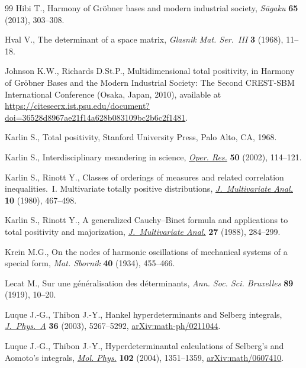 \documentclass[10pt,a4paper]{amsart}
\numberwithin{equation}{section}
\begin{document}
\begin{thebibliography}{99}
Hibi T., Harmony of {G}r\"obner bases and modern industrial society,
 \textit{S\={u}gaku} \textbf{65} (2013), 303--308.

Hval V., The determinant of a space matrix, \textit{Glasnik Mat. Ser.~{III}}
 \textbf{3} (1968), 11--18.

Johnson K.W., Richards D.St.P., Multidimensional total positivity, in Harmony of
 {G}r\"obner {B}ases and the {M}odern {I}ndustrial {S}ociety: {T}he {S}econd
 {CREST}-{SBM} {I}nternational {C}onference (Osaka, Japan, 2010), available at
 \url{https://citeseerx.ist.psu.edu/document?doi=36528d8967ae21f14a628b083109bc2b6c2f1481}.

Karlin S., Total positivity, Stanford University Press, Palo Alto, CA, 1968.

Karlin S., Interdisciplinary meandering in science, \href{https://doi.org/10.1287/opre.50.1.114.17800}{\textit{Oper. Res.}} \textbf{50} (2002), 114--121.

Karlin S., Rinott Y., Classes of orderings of measures and related correlation
 inequalities.~{I}. {M}ultivariate totally positive distributions,
 \href{https://doi.org/10.1016/0047-259X(80)90065-2}{\textit{J.~Multivariate
 Anal.}} \textbf{10} (1980), 467--498.

Karlin S., Rinott Y., A generalized {C}auchy--{B}inet formula and applications
 to total positivity and majorization,
 \href{https://doi.org/10.1016/0047-259X(88)90131-5}{\textit{J.~Multivariate
 Anal.}} \textbf{27} (1988), 284--299.

Krein M.G., On the nodes of harmonic oscillations of mechanical systems of a
 special form, \textit{Mat. Sbornik} \textbf{40} (1934), 455--466.

Lecat M., Sur une g\'en\'eralisation des d\'eterminants, \textit{Ann. Soc. Sci.
 Bruxelles} \textbf{89} (1919), 10--20.

Luque J.-G., Thibon J.-Y., Hankel hyperdeterminants and {S}elberg integrals,
 \href{https://doi.org/10.1088/0305-4470/36/19/306}{\textit{J.~Phys.~A}}
 \textbf{36} (2003), 5267--5292,
 \href{http://arxiv.org/abs/math-ph/0211044}{arXiv:math-ph/0211044}.

Luque J.-G., Thibon J.-Y., Hyperdeterminantal calculations of {S}elberg's and
 {A}omoto's integrals,
 \href{https://doi.org/10.1081/00268970410001728573}{\textit{Mol. Phys.}}
 \textbf{102} (2004), 1351--1359,
 \href{http://arxiv.org/abs/math/0607410}{arXiv:math/0607410}.


\end{thebibliography}
\end{document}
